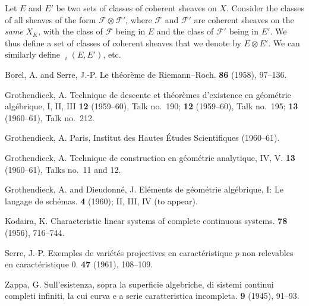 \documentclass{article}
\newcommand{\scr}[1]{{\mathscr{#1}}}
\DeclareMathOperator{\Tor}{Tor}
\DeclareMathOperator{\shTor}{\underline{\Tor}}
\begin{document}
Let $E$ and $E'$ be two sets of classes of coherent sheaves on $X$.
Consider the classes of all sheaves of the form $\scr{F}\otimes\scr{F}'$, where $\scr{F}$ and $\scr{F}'$ are coherent sheaves on the \emph{same} $X_K$, with the class of $\scr{F}$ being in $E$ and the class of $\scr{F}'$ being in $E'$.
We thus define a set of classes of coherent sheaves that we denote by $E\otimes E'$.
We can similarly define $\shTor_i(E,E')$, etc.







\nocite{*}
\begin{thebibliography}{8}

  {Borel, A. and Serre, J.-P.}
  \newblock Le th\'{e}or\`{e}me de Riemann--Roch.
   \textbf{86} (1958), 97--136.

  {Grothendieck, A.}
  \newblock Technique de descente et th\'{e}or\`{e}mes d'existence en g\'{e}om\'{e}trie alg\'{e}brique, I, II, III
   \textbf{12} (1959--60), Talk no.~190; \textbf{12} (1959--60), Talk no.~195; \textbf{13} (1960--61), Talk no.~212.

  {Grothendieck, A.}
  \newblock Paris, Institut des Hautes \'{E}tudes Scientifiques (1960--61).

  {Grothendieck, A.}
  \newblock Technique de construction en g\'{e}om\'{e}trie analytique, IV, V.
   \textbf{13} (1960--61), Talks no.~11 and 12.

  {Grothendieck, A. and Dieudonn\'{e}, J.}
  \newblock El\'{e}ments de g\'{e}om\'{e}trie alg\'{e}brique, I: Le langage de sch\'{e}mas.
   \textbf{4} (1960); II, III, IV (to appear).

  {Kodaira, K.}
  \newblock Characteristic linear systems of complete continuous systems.
   \textbf{78} (1956), 716--744.

  {Serre, J.-P.}
  \newblock Exemples de vari\'{e}t\'{e}s projectives en caract\'{e}ristique $p$ non relevables en caract\'{e}ristique $0$.
   \textbf{47} (1961), 108--109.

  {Zappa, G.}
  \newblock Sull'esistenza, sopra la superficie algebriche, di sistemi continui completi infiniti, la cui curva e a serie caratteristica incompleta.
   \textbf{9} (1945), 91--93.

\end{thebibliography}
\end{document}
